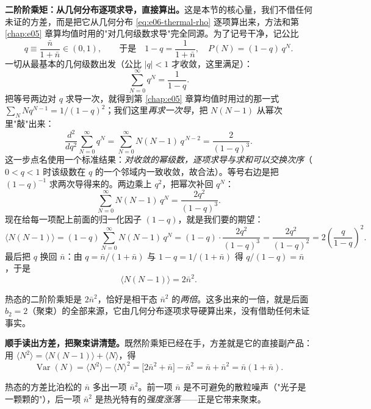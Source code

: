 \textbf{二阶阶乘矩：从几何分布逐项求导，直接算出。}这是本节的核心量，我们不借任何未证的方差，而是把它从几何分布 \eqref{eq:e06-thermal-rho} 逐项算出来，方法和第 \ref{chap:e05} 章算均值时用的"对几何级数求导"完全同源。为了记号干净，记公比
\[
  q\equiv\frac{\bar n}{1+\bar n}\in(0,1),
  \qquad\text{于是}\quad 1-q=\frac{1}{1+\bar n},\quad P(N)=(1-q)\,q^{N}.
\]
一切从最基本的几何级数出发（公比 \(|q|<1\) 才收敛，这里满足）：
\[
  \sum_{N=0}^{\infty}q^{N}=\frac{1}{1-q}.
\]
把等号两边对 \(q\) 求导一次，就得到第 \ref{chap:e05} 章算均值时用过的那一式 \(\sum_N N q^{N-1}=1/(1-q)^2\)；我们这里\emph{再求一次导}，把 \(N(N-1)\) 从幂次里"敲"出来：
\[
  \frac{d^{2}}{dq^{2}}\sum_{N=0}^{\infty}q^{N}
  =\sum_{N=0}^{\infty}N(N-1)\,q^{\,N-2}
  =\frac{2}{(1-q)^{3}} .
\]
这一步点名使用一个标准结果：\emph{对收敛的幂级数，逐项求导与求和可以交换次序}（\(0<q<1\) 时该级数在 \(q\) 的一个邻域内一致收敛，故合法）。等号右边是把 \((1-q)^{-1}\) 求两次导得来的。两边乘上 \(q^{2}\)，把幂次补回 \(q^{N}\)：
\[
  \sum_{N=0}^{\infty}N(N-1)\,q^{N}=\frac{2q^{2}}{(1-q)^{3}} .
\]
现在给每一项配上前面的归一化因子 \((1-q)\)，就是我们要的期望：
\[
  \langle N(N-1)\rangle
  =(1-q)\sum_{N=0}^{\infty}N(N-1)\,q^{N}
  =(1-q)\cdot\frac{2q^{2}}{(1-q)^{3}}
  =\frac{2q^{2}}{(1-q)^{2}}
  =2\left(\frac{q}{1-q}\right)^{2}.
\]
最后把 \(q\) 换回 \(\bar n\)：由 \(q=\bar n/(1+\bar n)\) 与 \(1-q=1/(1+\bar n)\) 得 \(q/(1-q)=\bar n\)，于是
\begin{equation}
  \langle N(N-1)\rangle=2\bar n^{2}.
  \label{eq:e06-thermal-fm}
\end{equation}
\begin{formulaexplain}
热态的二阶阶乘矩是 \(2\bar n^2\)，恰好是相干态 \(\bar n^2\) 的\emph{两倍}。这多出来的一倍，就是后面 \(b_2=2\)（聚束）的全部来源，它由几何分布逐项求导硬算出来，没有借助任何未证事实。
\end{formulaexplain}

\textbf{顺手读出方差，把聚束讲清楚。}既然阶乘矩已经在手，方差就是它的直接副产品：用 \(\langle N^2\rangle=\langle N(N-1)\rangle+\langle N\rangle\)，得
\begin{equation}
  \operatorname{Var}(N)=\langle N^{2}\rangle-\langle N\rangle^{2}
  =\big[2\bar n^{2}+\bar n\big]-\bar n^{2}
  =\bar n+\bar n^{2}=\bar n(1+\bar n).
  \label{eq:e06-thermal-var}
\end{equation}
\begin{formulaexplain}
热态的方差比泊松的 \(\bar n\) 多出一项 \(\bar n^2\)。前一项 \(\bar n\) 是不可避免的散粒噪声（"光子是一颗颗的"），后一项 \(\bar n^2\) 是热光特有的\emph{强度涨落}——正是它带来聚束。
\end{formulaexplain}

